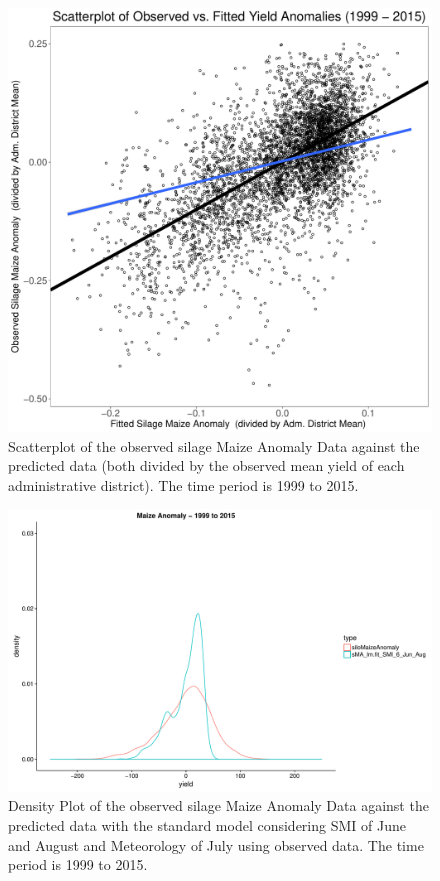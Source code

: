 \documentclass[12pt]{iopart}
\begin{document}
\begin{figure}
	\label{scatter:2f}
	\centering
	\includegraphics[width=1\textwidth]{figures/Train_1999-2015_norm.pdf}
	\caption{Scatterplot of the observed silage Maize Anomaly Data against the predicted data (both divided by the observed mean yield of each administrative district). The time period is 1999 to 2015.}
\end{figure}


\begin{figure}
	\label{density:1f}
	\centering
	\includegraphics[width=1\textwidth]{figures/Density_19992015_Anomalies_sMA_lmfit_SMI_6_Jun_Aug.pdf}
	\caption{Density Plot of the observed silage Maize Anomaly Data against the predicted data with the standard model considering SMI of June and August and
		Meteorology of July using observed data. The time period is 1999 to 2015.}
\end{figure}
\end{document}
